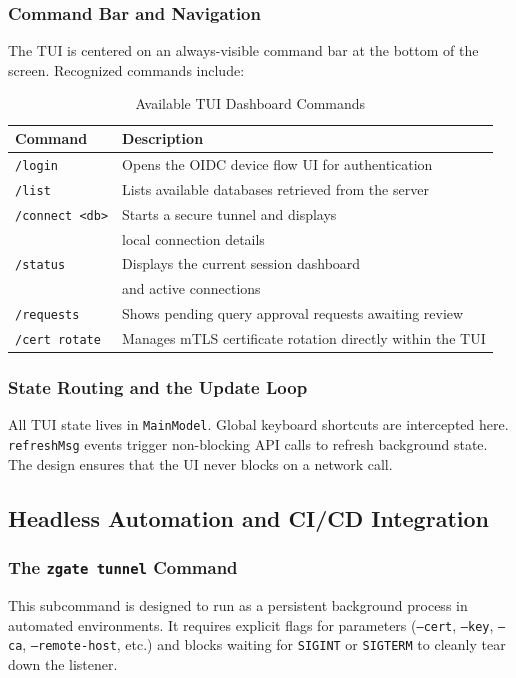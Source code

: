 \subsubsection{Command Bar and Navigation}
The TUI is centered on an always-visible command bar at the bottom of the screen. Recognized commands include:

\begin{table}[H]
\centering
\small
\begin{tabular}{|l|l|}
\hline

\textbf{Command} & \textbf{Description} \\
\hline
\texttt{/login} & Opens the OIDC device flow UI for authentication \\
\hline
\texttt{/list} & Lists available databases retrieved from the server \\
\hline
\texttt{/connect \textless db\textgreater} & Starts a secure tunnel and displays \\
 & local connection details \\
\hline
\texttt{/status} & Displays the current session dashboard \\
 & and active connections \\
\hline
\texttt{/requests} & Shows pending query approval requests awaiting review \\
\hline
\texttt{/cert rotate} & Manages mTLS certificate rotation directly within the TUI \\
\hline
\end{tabular}
\caption{Available TUI Dashboard Commands}
\end{table}

\subsubsection{State Routing and the Update Loop}
All TUI state lives in \texttt{MainModel}. Global keyboard shortcuts are intercepted here. \texttt{refreshMsg} events trigger non-blocking API calls to refresh background state. The design ensures that the UI never blocks on a network call.

\subsection{Headless Automation and CI/CD Integration}

\subsubsection{The \texttt{zgate tunnel} Command}
This subcommand is designed to run as a persistent background process in automated environments. It requires explicit flags for parameters (\texttt{--cert}, \texttt{--key}, \texttt{--ca}, \texttt{--remote-host}, etc.) and blocks waiting for \texttt{SIGINT} or \texttt{SIGTERM} to cleanly tear down the listener.

